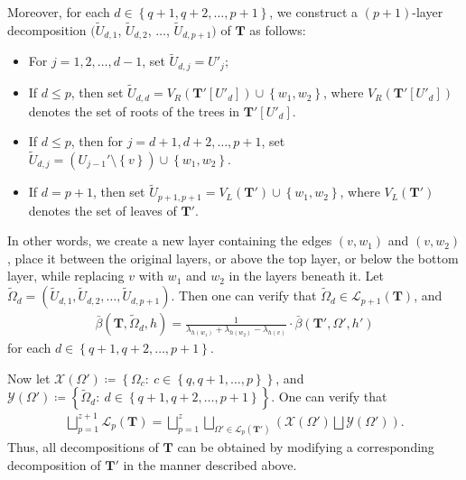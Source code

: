 \documentclass[superscriptaddress,onecolumn,nofootinbib,longbibliography,a4paper,accepted=2026-09-29]{quantumarticle}
\theoremstyle{plain}
\theoremstyle{definition}
\numberwithin{thm}{section}
\numberwithin{assumption}{section}
\numberwithin{lemma}{section}
\numberwithin{prop}{section}
\numberwithin{cor}{section}
\numberwithin{definition}{section}
\numberwithin{rmk}{section}
\numberwithin{equation}{section}
\newcommand{\lrb}[1]{\left ( #1 \right )}
\newcommand{\lrcb}[1]{\left \{ #1 \right \}}
\newcommand{\defeq}{\coloneqq}
\newcommand{\mbf}{\mathbf{T}}
\begin{document}
\begin{itemize}
Moreover, for each $d \in \lrcb{q+1,q+2,\dots,p+1}$, we construct a $(p+1)$-layer decomposition $(\tilde{U}_{d,1}$, $\tilde{U}_{d,2}$, $\dots$, $\tilde{U}_{d,p+1})$
of $\mbf$ as follows: 
\begin{itemize}
    \item For $j=1,2,\dots,d-1$, set $\tilde{U}_{d,j}=U'_j$;   
    \item If $d \le p$, then set $\tilde{U}_{d,d}=V_R(\mbf'[U'_d]) \cup \lrcb{w_1, w_2}$, where $V_R(\mbf'[U'_d])$ denotes the set of roots of the trees in $\mbf'[U'_d]$.
    \item If $d \le p$, then for $j=d+1,d+2,\dots,p+1$, set $\tilde{U}_{d,j}=(U_{j-1}' \setminus \lrcb{v}) \cup \lrcb{w_1, w_2}$.    
    \item If $d=p+1$, then set $\tilde{U}_{p+1, p+1}=V_L(\mbf') \cup \lrcb{w_1, w_2}$, where $V_L(\mbf')$ denotes the set of leaves of $\mbf'$.
\end{itemize}
In other words, we create a new layer containing the edges $(v, w_1)$ and $(v, w_2)$, place it between the original layers, or above the top layer, or below the bottom layer, while replacing $v$ with $w_1$ and $w_2$ in the layers beneath it. Let $\tilde{\Omega}_d = (\tilde{U}_{d,1}, \tilde{U}_{d,2}, \dots, \tilde{U}_{d,p+1})$. Then one can verify that
$\tilde{\Omega}_d\in \mathcal{L}_{p+1}(\mbf)$, and 
\begin{align}
\bar{\beta}(\mbf, \tilde{\Omega}_d, h)
=\frac{1}{\lambda_{h(w_1)}+\lambda_{h(w_2)}-\lambda_{h(v)}} \cdot
\bar{\beta}(\mbf', \Omega', h')
\label{eq:induction_relation5}
\end{align}
for each $d \in \lrcb{q+1,q+2,\dots,p+1}$.

Now let $\mathcal{X}(\Omega')\defeq\lrcb{\Omega_c:~c \in \lrcb{q,q+1,\dots,p}}$, 
and $\mathcal{Y}(\Omega')\defeq\lrcb{\tilde{\Omega}_d:~d \in \lrcb{q+1,q+2, \dots, p+1}}$.
One can verify that
\begin{align}
\bigsqcup_{p=1}^{z+1}\mathcal{L}_{p}(\mbf) = 
\bigsqcup_{p=1}^z
\bigsqcup_{\Omega' \in \mathcal{L}_p(\mbf')}
\lrb{\mathcal{X}(\Omega')
\bigsqcup \mathcal{Y}(\Omega')}.
\label{eq:induction_partition2}
\end{align}
Thus, all decompositions of $\mbf$ can be obtained by modifying a corresponding decomposition of $\mbf'$ in the manner described above.


\end{itemize}
\end{document}
